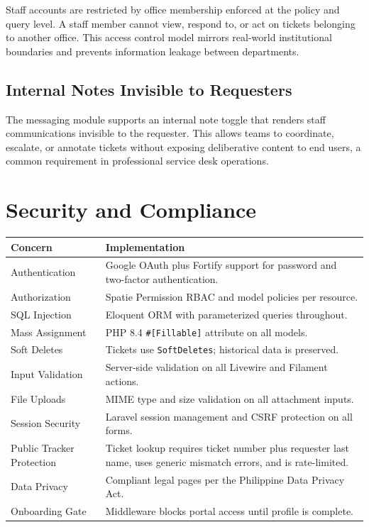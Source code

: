 \documentclass[12pt,a4paper]{article}
\newcommand{\code}[1]{\texttt{#1}}
\begin{document}
Staff accounts are restricted by office membership enforced at the policy and query level. A staff member cannot view, respond to, or act on tickets belonging to another office. This access control model mirrors real-world institutional boundaries and prevents information leakage between departments.

\subsection{Internal Notes Invisible to Requesters}

The messaging module supports an internal note toggle that renders staff communications invisible to the requester. This allows teams to coordinate, escalate, or annotate tickets without exposing deliberative content to end users, a common requirement in professional service desk operations.

\section{Security and Compliance}

\begin{longtable}{@{} p{} p{} @{}}
\toprule
\textbf{Concern} & \textbf{Implementation} \\
\midrule
\endhead
Authentication & Google OAuth plus Fortify support for password and two-factor authentication. \\
Authorization & Spatie Permission RBAC and model policies per resource. \\
SQL Injection & Eloquent ORM with parameterized queries throughout. \\
Mass Assignment & PHP 8.4 \code{\#[Fillable]} attribute on all models. \\
Soft Deletes & Tickets use \code{SoftDeletes}; historical data is preserved. \\
Input Validation & Server-side validation on all Livewire and Filament actions. \\
File Uploads & MIME type and size validation on all attachment inputs. \\
Session Security & Laravel session management and CSRF protection on all forms. \\
Public Tracker Protection & Ticket lookup requires ticket number plus requester last name, uses generic mismatch errors, and is rate-limited. \\
Data Privacy & Compliant legal pages per the Philippine Data Privacy Act. \\
Onboarding Gate & Middleware blocks portal access until profile is complete. \\
\bottomrule
\end{longtable}
\end{document}
